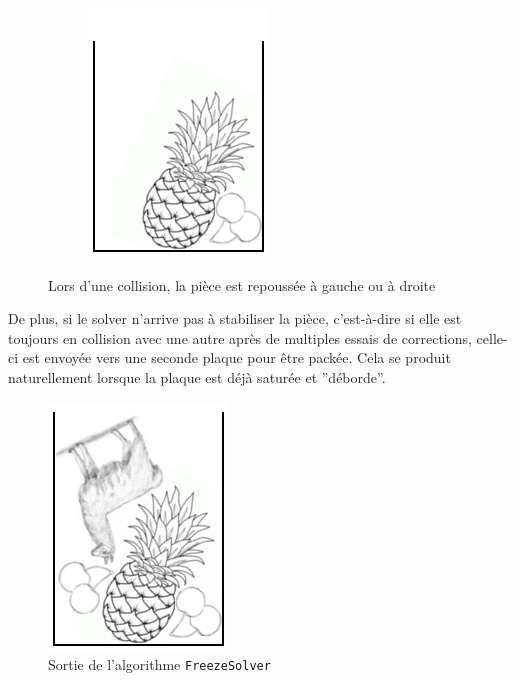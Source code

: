 \begin{figure}[!htb]
\begin{subfigure}{.30\linewidth}
        \includegraphics[width=\linewidth]{img/FreezeE.png}
    \end{subfigure}
    
    \caption{Lors d'une collision, la pièce est repoussée à gauche ou à droite}
    \label{fig:FreezeCD}
\end{figure}

De plus, si le solver n'arrive pas à stabiliser la pièce, c'est-à-dire si elle est toujours en collision avec une autre après de multiples essais de corrections, celle-ci est envoyée vers une seconde plaque pour être packée. Cela se produit naturellement lorsque la plaque est déjà saturée et ''déborde''.

\begin{figure}[!htb]
\centering
\includegraphics[scale=1]{img/FreezeG.png}
\caption{Sortie de l'algorithme \texttt{FreezeSolver}}
\label{fig:FreezeSolver}
\end{figure}

